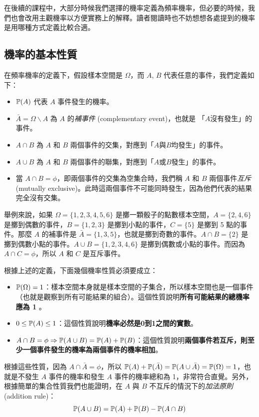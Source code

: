     在後續的課程中，大部分時候我們選擇的機率定義為頻率機率，但必要的時候，我們也會改用主觀機率以方便實務上的解釋。讀者閱讀時也不妨想想各處提到的機率是用哪種方式定義比較合適。
\subsection{機率的基本性質}
    在頻率機率的定義下，假設樣本空間是 $\Omega$，而 $A$, $B$ 代表任意的事件，我們定義如下：
    \begin{itemize}
        \item $\mathbb{P}(A)$ 代表 $A$ 事件發生的機率。
        \item $\bar{A} = \Omega \backslash A$ 為 $A$ 的\textit{補事件} (complementary event)，也就是 「$A$沒有發生」的事件。
        \item $A \cap B$ 為 $A$ 和 $B$ 兩個事件的交集，對應到「$A$與$B$均發生」的事件。
        \item $A \cup B$ 為 $A$ 和 $B$ 兩個事件的聯集，對應到「$A$或$B$發生」的事件。
        \item 當 $A \cap B = \phi$，即兩個事件的交集為空集合時，我們稱 $A$ 和 $B$ 兩個事件\textit{互斥} (mutually exclusive)。此時這兩個事件不可能同時發生，因為他們代表的結果完全沒有交集。
    \end{itemize}
    舉例來說，如果 $\Omega = \{1,2,3,4,5,6\}$ 是擲一顆骰子的點數樣本空間，$A = \{2,4,6\}$ 是擲到偶數的事件，$B = \{1,2,3\}$ 是擲到小點的事件，$C = \{5\}$ 是擲到 5 點的事件。那麼 $A$ 的補事件是 $\bar{A} = \{1,3,5\}$，也就是擲到奇數的事件。$A \cap B = \{2\}$ 是擲到偶數小點的事件。$A \cup B = \{1,2,3,4,6\}$ 是擲到偶數或小點的事件。而因為 $A \cap C = \phi$，所以 $A$ 和 $C$ 是互斥事件。

    根據上述的定義，下面幾個機率性質必須要成立：
    
    \begin{itemize}
        \item $\mathbb{P}(\Omega) = 1$：樣本空間本身就是樣本空間的子集合，所以樣本空間也是一個事件（也就是觀察到所有可能結果的組合）。這個性質說明\textbf{所有可能結果的總機率應為 1} 。
        \item $0 \le \mathbb{P}(A) \le 1$：這個性質說明\textbf{機率必然是0到1之間的實數}。
        \item $A \cap B = \phi \Rightarrow \mathbb{P}(A \cup B) = \mathbb{P}(A) + \mathbb{P}(B)$：這個性質說明\textbf{兩個事件若互斥，則至少一個事件發生的機率為兩個事件的機率相加}。
    \end{itemize}

    根據這些性質，因為 $A \cap \bar{A} = \phi$，所以 $\mathbb{P}(A) + \mathbb{P}(\bar{A}) = \mathbb{P}(A \cup \bar{A}) = \mathbb{P}(\Omega) = 1$，也就是不發生 $A$ 事件的機率和發生 $A$ 事件的機率總和為 1，非常符合直覺。另外，根據簡單的集合性質我們也能證明，在 $A$ 與 $B$ 不互斥的情況下的\textit{加法原則} (addition rule)：
    \[\mathbb{P}(A \cup B) = \mathbb{P}(A) + \mathbb{P}(B) - \mathbb{P}(A \cap B)\]



